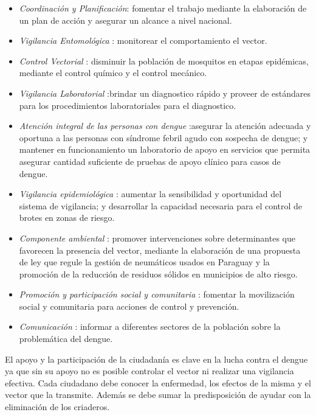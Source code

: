 \begin{itemize}
    \item \textit{Coordinación y Planificación}: fomentar el trabajo mediante la elaboración de un plan de acción y asegurar un alcance a nivel nacional.

    \item \textit{Vigilancia Entomológica} : monitorear el comportamiento el vector.

    \item \textit{Control Vectorial} : disminuir la población de mosquitos en etapas epidémicas, mediante el control químico y el control mecánico.

    \item \textit{Vigilancia Laboratorial} :brindar un diagnostico rápido y proveer de estándares para los procedimientos laboratoriales para el diagnostico.

    \item \textit{Atención integral de las personas con dengue} :asegurar la atención adecuada y oportuna a las personas con síndrome febril agudo con sospecha de dengue; y  mantener en funcionamiento un laboratorio de apoyo en servicios que permita asegurar cantidad suficiente de pruebas de apoyo clínico para casos de dengue.

    \item \textit{Vigilancia epidemiológica} : aumentar la sensibilidad y oportunidad del sistema de vigilancia; y desarrollar la capacidad necesaria para el control de brotes en zonas de riesgo.

    \item \textit{Componente ambiental} : promover intervenciones sobre determinantes que favorecen la presencia del vector, mediante la elaboración de una propuesta de ley que regule la gestión de neumáticos usados en Paraguay y la promoción de la reducción de residuos sólidos en municipios de alto riesgo.

    \item \textit{Promoción y participación social y comunitaria} : fomentar la movilización social y comunitaria para acciones de control y prevención.

    \item \textit{Comunicación} : informar a diferentes sectores de la población sobre la problemática del dengue.
\end{itemize}

El apoyo y la participación de la ciudadanía es clave en la lucha contra el dengue ya que sin su
apoyo no es posible controlar el vector ni realizar una vigilancia efectiva. Cada ciudadano debe
conocer la enfermedad, los efectos de la misma y el vector que la transmite. Además se debe sumar
la predisposición de ayudar con la eliminación de los criaderos.

